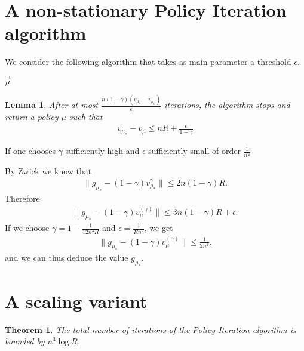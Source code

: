 \documentclass{article}
\newtheorem{theorem}{Theorem}
\newtheorem{lemma}{Lemma}
\begin{document}
  \section{A non-stationary Policy Iteration algorithm}

  We consider the following algorithm that takes as main parameter a threshold $\epsilon$.

  $\vec\mu$

  \begin{lemma}
    After at most $\frac{n(1-\gamma)(v_{\mu_*}-v_{\mu_0})}{\epsilon}$ iterations, the algorithm stops and return a policy $\mu$ such that
    \begin{align}
      v_{\mu_*} - v_{\mu} \le n R + \frac{\epsilon}{1-\gamma}
    \end{align}
  \end{lemma}

  If one chooses $\gamma$ sufficiently high and $\epsilon$ sufficiently small of order $\frac{1}{n^2}$

  By Zwick we know that
  \begin{align}
   \| g_{\mu_*} - (1-\gamma) v_{\mu_*}^\gamma \| \le 2n(1-\gamma)R.
  \end{align}
  Therefore
  \begin{align}
  \| g_{\mu_*} - (1-\gamma) v^{(\gamma)}_{\mu} \| \le 3n(1-\gamma)R + \epsilon.
  \end{align}
  If we choose $\gamma=1-\frac{1}{12n^3 R}$ and $\epsilon=\frac{1}{Rn^2}$, we get
  \begin{align}
    \| g_{\mu_*} - (1-\gamma) v^{(\gamma)}_{\mu} \| \le \frac{1}{2n^2}.
  \end{align}
  and we can thus deduce the value $g_{\mu_*}$.
  
  \section{A scaling variant}

  
  

  \begin{theorem}
    The total number of iterations of the Policy Iteration algorithm is bounded by $n^3 \log R$.
  \end{theorem}
  
 





\end{document}
